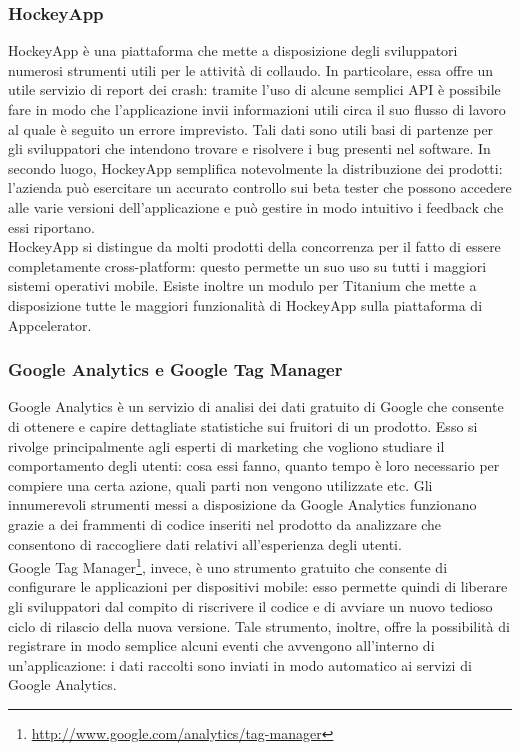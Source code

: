 			\subsubsection{HockeyApp}
				HockeyApp è una piattaforma che mette a disposizione degli sviluppatori numerosi strumenti utili per le attività
				di collaudo. In particolare, essa offre un utile servizio di report dei crash: tramite l'uso di alcune semplici API è
				possibile fare in modo che l'applicazione invii informazioni utili circa il suo flusso di lavoro al quale è seguito
				un errore imprevisto. Tali dati sono utili basi di partenze per gli sviluppatori che intendono trovare e risolvere i
				bug presenti nel software. In secondo luogo, HockeyApp semplifica notevolmente la distribuzione dei prodotti:
				l'azienda può esercitare un accurato controllo sui beta tester che possono accedere alle varie versioni
				dell'applicazione e può gestire in modo intuitivo i feedback che essi riportano.\\
				HockeyApp si distingue da molti prodotti della concorrenza per il fatto di essere completamente cross-platform:
				questo permette un suo uso su tutti i maggiori sistemi operativi mobile. Esiste inoltre un modulo per Titanium che
				mette a disposizione tutte le maggiori funzionalità di HockeyApp sulla piattaforma di Appcelerator.
			\subsubsection{Google Analytics e Google Tag Manager}
				Google Analytics è un servizio di analisi dei dati gratuito di Google che consente di ottenere e capire dettagliate
				statistiche sui fruitori di un prodotto. Esso si rivolge principalmente agli esperti di marketing che vogliono
				studiare il comportamento degli utenti: cosa essi fanno, quanto tempo è loro necessario per compiere una certa
				azione, quali parti non vengono utilizzate etc. Gli innumerevoli strumenti messi a disposizione da Google Analytics
				funzionano grazie a dei frammenti di codice inseriti nel prodotto da analizzare che consentono di raccogliere dati
				relativi all'esperienza degli utenti.\\
				Google Tag Manager\footnote{\url{http://www.google.com/analytics/tag-manager}}, invece, è uno strumento gratuito che consente
				di configurare le applicazioni per dispositivi mobile: esso permette quindi di liberare gli sviluppatori dal compito
				di riscrivere il codice e di avviare un nuovo tedioso ciclo di rilascio della nuova versione. Tale strumento,
				inoltre, offre la possibilità di registrare in modo semplice alcuni eventi che avvengono all'interno di
				un'applicazione: i dati raccolti sono inviati in modo automatico ai servizi di Google Analytics.
